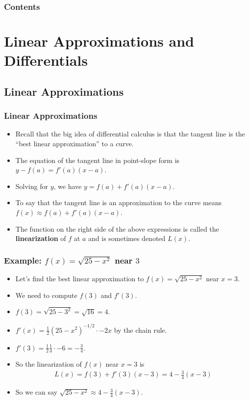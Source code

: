 \documentclass[serif,ignorenonframetext]{beamer}
\title{\commonTitleZeroTwoNine}
\subtitle{\commonSubtitleZeroTwoNine}
\author{\commonAuthor}
\institute{\commonInstitute}
\date{\commonDateZeroTwoNine}
\newcommand{\ds}{\displaystyle}
\begin{document}

\begin{frame}
  \titlepage
\end{frame}

\begin{frame}
  \frametitle{Contents}
  \tableofcontents
\end{frame}

\section{Linear Approximations and Differentials}


\subsection{Linear Approximations}

\begin{frame}
  \frametitle{Linear Approximations}
  \begin{itemize}[<+->]
  \item Recall that the big idea of differential calculus is that
    the tangent line is the ``best linear approximation'' to a curve.
  \item The equation of the tangent line in point-slope form
    is $y-f(a)=f'(a)(x-a)$.
  \item Solving for $y$, we have $y=f(a) + f'(a) (x-a)$.
  \item To say that the tangent line is an approximation to the curve
    means $f(x) \approx f(a) + f'(a) (x-a)$.
  \item The function on the right side of the above expressions is
    called the \textbf{linearization} of $f$ at $a$ and is sometimes
    denoted $L(x)$.
  \end{itemize}
\end{frame}

\begin{frame}
  \frametitle{Example: $f(x)=\sqrt{25-x^2}$ near $3$}
  \begin{itemize}[<+->]
  \item Let's find the best linear approximation to $f(x)=\sqrt{25-x^2}$
    near $x=3$.
  \item We need to compute $f(3)$ and $f'(3)$.
  \item $\ds f(3)=\sqrt{25-3^2} = \sqrt{16} = 4$.
  \item $\ds f'(x) = \frac{1}{2} (25-x^2)^{-1/2} \cdot -2x$ by the chain
    rule.
  \item $\ds f'(3)= \frac{1}{2} \frac{1}{4} \cdot -6 = -\frac{3}{4}$.
  \item So the linearization of $f(x)$ near $x=3$ is 
    \begin{align*}
      L(x)= f(3) + f'(3) (x-3) = 4 - \frac{3}{4} (x-3)
    \end{align*}
  \item So we can say $\ds \sqrt{25-x^2} \approx 4-\frac{3}{4} (x-3)$.
  \end{itemize}
\end{frame}
\end{document}
